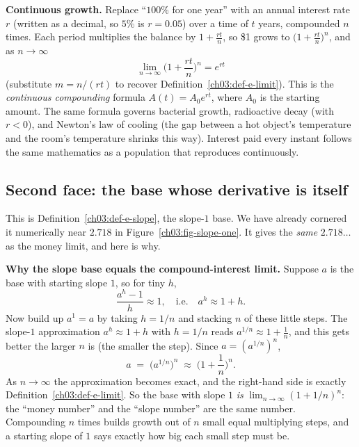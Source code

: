 \begin{applicationbox}
\textbf{Continuous growth.} Replace ``$100\%$ for one year'' with an annual interest rate $r$ (written as a decimal, so $5\%$ is $r=0.05$) over a time of $t$ years, compounded $n$ times. Each period multiplies the balance by $1+\tfrac{rt}{n}$, so \$1 grows to $\big(1+\tfrac{rt}{n}\big)^{n}$, and as $n\to\infty$
\[
\lim_{n\to\infty}\Big(1+\frac{rt}{n}\Big)^{n} = e^{rt}
\]
(substitute $m=n/(rt)$ to recover Definition~\ref{ch03:def-e-limit}). This is the \emph{continuous compounding} formula $A(t)=A_0 e^{rt}$, where $A_0$ is the starting amount. The same formula governs bacterial growth, radioactive decay (with $r<0$), and Newton's law of cooling (the gap between a hot object's temperature and the room's temperature shrinks this way). Interest paid every instant follows the same mathematics as a population that reproduces continuously.
\end{applicationbox}

\subsection{Second face: the base whose derivative is itself}

This is Definition~\ref{ch03:def-e-slope}, the slope-$1$ base. We have already cornered it numerically near $2.718$ in Figure~\ref{ch03:fig-slope-one}. It gives the \emph{same} $2.718\ldots$ as the money limit, and here is why.

\begin{whybox}
\textbf{Why the slope base equals the compound-interest limit.} Suppose $a$ is the base with starting slope $1$, so for tiny $h$,
\[
\frac{a^{h}-1}{h}\approx 1, \quad\text{i.e.}\quad a^{h}\approx 1+h .
\]
Now build up $a^1=a$ by taking $h=1/n$ and stacking $n$ of these little steps. The slope-$1$ approximation $a^{h}\approx 1+h$ with $h=1/n$ reads $a^{1/n}\approx 1+\tfrac1n$, and this gets better the larger $n$ is (the smaller the step). Since $a = (a^{1/n})^n$,
\[
a \;=\; \big(a^{1/n}\big)^{n} \;\approx\; \Big(1+\frac1n\Big)^{n}.
\]
As $n\to\infty$ the approximation becomes exact, and the right-hand side is exactly Definition~\ref{ch03:def-e-limit}. So the base with slope $1$ \emph{is} $\lim_{n\to\infty}(1+1/n)^n$: the ``money number'' and the ``slope number'' are the same number. Compounding $n$ times builds growth out of $n$ small equal multiplying steps, and a starting slope of $1$ says exactly how big each small step must be.
\end{whybox}

